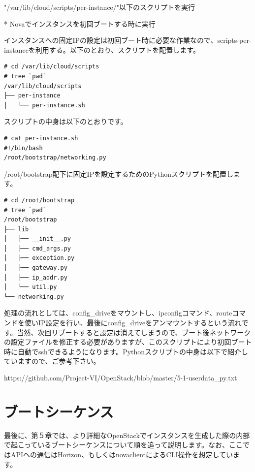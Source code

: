 \documentclass[9pt,b5paper,tombo,openany,dvipdfmx]{jsbook}
\begin{document}
"/var/lib/cloud/scripts/per-instance/"以下のスクリプトを実行

* Novaでインスタンスを初回ブートする時に実行

インスタンスへの固定IPの設定は初回ブート時に必要な作業なので、scripts-per-instanceを利用する。以下のとおり、スクリプトを配置します。

\begin{verbatim}
# cd /var/lib/cloud/scripts
# tree `pwd`
/var/lib/cloud/scripts
├── per-instance
│   └── per-instance.sh
\end{verbatim}

スクリプトの中身は以下のとおりです。

\begin{lstlisting}
# cat per-instance.sh
#!/bin/bash
/root/bootstrap/networking.py
\end{lstlisting}

/root/bootstrap配下に固定IPを設定するためのPythonスクリプトを配置します。

{\footnotesize
	\begin{verbatim}
# cd /root/bootstrap
# tree `pwd`
/root/bootstrap
├── lib
│   ├── __init__.py
│   ├── cmd_args.py
│   ├── exception.py
│   ├── gateway.py
│   ├── ip_addr.py
│   └── util.py
└── networking.py
	\end{verbatim}
}

処理の流れとしては、config\_driveをマウントし、ipconfigコマンド、routeコマンドを使いIP設定を行い、最後にconfig\_driveをアンマウントするという流れです。当然、次回リブートすると設定は消えてしまうので、ブート後ネットワークの設定ファイルを修正する必要がありますが、このスクリプトにより初回ブート時に自動でsshできるようになります。Pythonスクリプトの中身は以下で紹介していますので、ご参考下さい。

https://github.com/Project-VI/OpenStack/blob/master/5-1-userdata\_py.txt

\stopcontents[sections]

\chapter{ブートシーケンス}

最後に、第５章では、より詳細なOpenStackでインスタンスを生成した際の内部で起こっているブートシーケンスについて順を追って説明します。なお、ここではAPIへの通信はHorizon、もしくはnovaclientによるCLI操作を想定しています。
\end{document}
